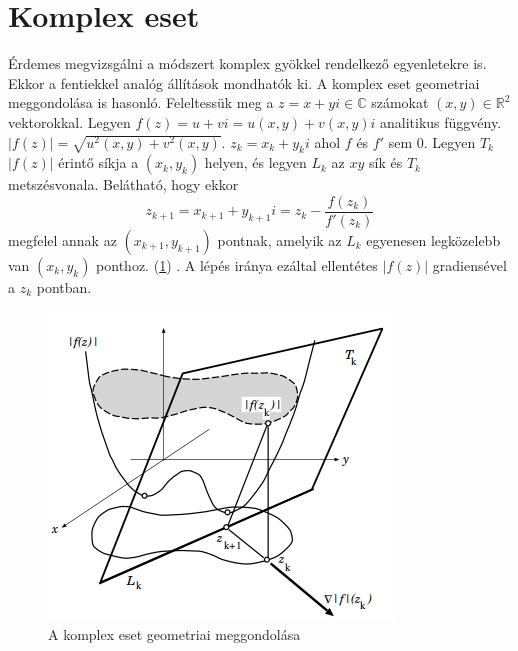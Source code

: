 \documentclass[a4paper,12pt]{report}
\begin{document}












		\section{Komplex eset}
			Érdemes megvizsgálni a módszert komplex gyökkel rendelkező egyenletekre is. Ekkor a fentiekkel analóg állítások mondhatók ki. A komplex eset geometriai meggondolása is hasonló. Feleltessük meg a $z=x+yi \in \mathbb{C}$ számokat $(x,y)\in\mathbb{R}^2$ vektorokkal. Legyen $f(z)=u+vi=u(x,y)+v(x,y)i$ analitikus függvény. $|f(z)|=\sqrt{u^2(x,y)+v^2(x,y)}$. $z_k=x_k+y_ki$ ahol $f$ és $f'$ sem 0. Legyen $T_k$ $|f(z)|$ érintő síkja a $(x_k,y_k)$ helyen, és legyen $L_k$ az $xy$ sík és $T_k$ metszésvonala. Belátható, hogy ekkor \[z_{k+1}=x_{k+1}+y_{k+1}i=z_k-\frac{f(z_k)}{f'(z_k)}\] megfelel annak az $(x_{k+1},y_{k+1})$ pontnak, amelyik az $L_k$ egyenesen legközelebb van $(x_k,y_k)$ ponthoz. (\ref{k6}) \cite[p. 809]{Yau98}. A lépés iránya ezáltal ellentétes $|f(z)|$ gradiensével a $z_k$ pontban.
			
			 \begin{figure}[ht]
				\begin{center}
				\includegraphics[scale=0.7]{kep6.png}
				\caption{A komplex eset geometriai meggondolása \cite[p. 807]{Yau98}} \label{k6}
				\end{center}
			\end{figure}
			
\end{document}
